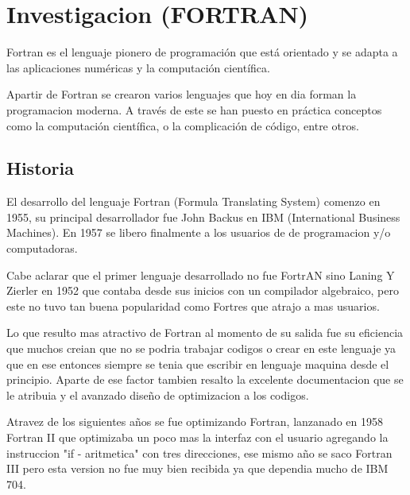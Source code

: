 \section{Investigacion (FORTRAN)}

Fortran es el lenguaje pionero de programación que está orientado y se adapta a las aplicaciones numéricas y la computación científica.

\vspace{0.2in}

Apartir de Fortran se crearon varios lenguajes que hoy en dia forman la programacion moderna. A través de este se han puesto en práctica conceptos como la computación científica, o la complicación de código, entre otros.

\subsection{Historia}

El desarrollo del lenguaje Fortran (Formula Translating System) comenzo en 1955, su principal desarrollador fue John Backus en IBM (International Business Machines). En 1957 se libero finalmente a los usuarios de de programacion y/o computadoras.

\vspace{0.2in}

Cabe aclarar que el primer lenguaje desarrollado no fue FortrAN sino Laning Y Zierler en 1952 que contaba desde sus inicios con un compilador algebraico, pero este no tuvo tan buena popularidad como Fortres que atrajo a mas usuarios.

\vspace{0.2in}

Lo que resulto mas atractivo de Fortran al momento de su salida fue su eficiencia que muchos creian que no se podria trabajar codigos o crear en este lenguaje ya que en ese entonces siempre se tenia que escribir en lenguaje maquina desde el principio. Aparte de ese factor tambien resalto la excelente documentacion que se le atribuia y el avanzado diseño de optimizacion a los codigos.

\vspace{0.2in}

Atravez de los siguientes años se fue optimizando Fortran, lanzanado en 1958 Fortran II que optimizaba un poco mas la interfaz con el usuario agregando la instruccion "if - aritmetica" con tres direcciones, ese mismo año se saco Fortran III pero esta version no fue muy bien recibida ya que dependia mucho de IBM 704. 

